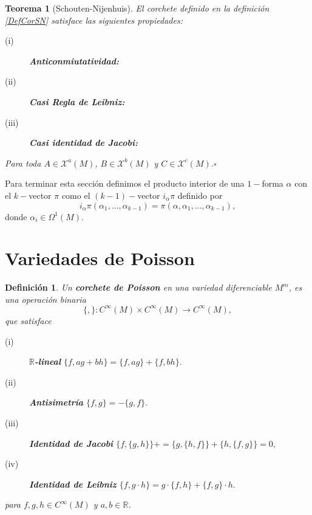 \documentclass[a4paper,10pt]{book}
\newtheorem{teo}{Teorema}[chapter]
\newtheorem{definicion}{Definici\'on}[chapter]
\begin{document}
\begin{teo}[Schouten-Nijenhuis]
El corchete definido en la definici\'on \ref{DefCorSN} satisface las siguientes propiedades:
\begin{description}
    \item [(i)]   {\bfseries Anticonmiutatividad:} 
    \item [(ii)]  {\bfseries Casi Regla de Leibniz:} 
    \item [(iii)] {\bfseries Casi identidad de Jacobi:} 
\end{description}
Para toda $A\in\mathcal{X}^{a}(M)$, $B\in\mathcal{X}^{b}(M)$ y $C\in\mathcal{X}^{c}(M)$.\hfill $\square$
\end{teo}

Para terminar esta secci\'on definimos el producto interior de una $1-$forma $\alpha$ con el $k-$vector $\pi$ como el $(k-1)-$vector $i_{\alpha}\pi$ definido por  
$$i_{\alpha}\pi(\alpha_{1},...,\alpha_{k-1})=\pi(\alpha,\alpha_{1},...,\alpha_{k-1}),$$
donde $\alpha_{i}\in\Omega^{1}(M)$. 

\section{Variedades de Poisson}\label{2.2}
\begin{definicion}\label{DefPoi}
Un {\bfseries corchete de Poisson} en una variedad diferenciable $M^{m}$, es una operaci\'on binaria $$\{,\}:C^{\infty}(M)\times C^{\infty}(M)\to C^{\infty}(M),$$ que satisface 

\begin{description}
    \item [(i)]   {\bfseries $\mathbb{R}$-lineal} $\{f,ag+bh\}=\{f,ag\}+\{f,bh\}.$ 
    \item [(ii)]  {\bfseries Antisimetr\'ia} $\{f,g\}=-\{g,f\}.$ 
    \item [(iii)] {\bfseries Identidad de Jacobi} $\{f,\{g,h\}\}+=\{g,\{h,f\}\}+\{h,\{f,g\}\}=0,$
    \item [(iv)]  {\bfseries Identidad de Leibniz} $\{f,g\cdot h\}=g\cdot\{f,h\}+\{f,g\}\cdot h.$
\end{description}
para $f,g,h\in C^{\infty}(M)$ y $a,b\in\mathbb{R}$. 
\end{definicion}
\end{document}
